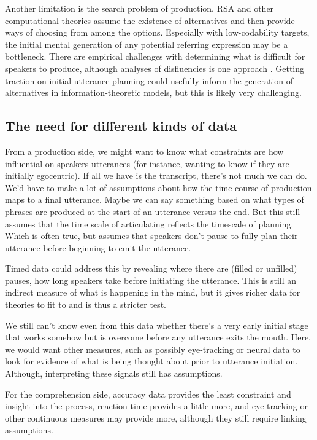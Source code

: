 \documentclass[]{article}
\begin{document}
Another limitation is the search problem of production. RSA and other computational theories assume the existence of alternatives and then provide ways of choosing from among the options. Especially with low-codability targets, the initial mental generation of any potential referring expression may be a bottleneck. There are empirical challenges with determining what is difficult for speakers to produce, although analyses of disfluencies is one approach \citep{yoon2014}.  Getting traction on initial utterance planning could usefully inform the generation of alternatives in information-theoretic models, but this is likely very challenging. 

\subsection{The need for different kinds of data}

From a production side, we might want to know what constraints are how influential on speakers utterances (for instance, wanting to know if they are initially egocentric). If all we have is the transcript, there's not much we can do. We'd have to make a lot of assumptions about how the time course of production maps to a final utterance. Maybe we can say something based on what types of phrases are produced at the start of an utterance versus the end. But this still assumes that the time scale of articulating reflects the timescale of planning. Which is often true, but assumes that speakers don't pause to fully plan their utterance before beginning to emit the utterance. 

Timed data could address this by revealing where there are (filled or unfilled) pauses, how long speakers take before initiating the utterance. This is still an indirect measure of what is happening in the mind, but it gives richer data for theories to fit to and is thus a stricter test. 

We still can't know even from this data whether there's a very early initial stage that works somehow but is overcome before any utterance exits the mouth. Here, we would want other measures, such as possibly eye-tracking or neural data to look for evidence of what is being thought about prior to utterance initiation. Although, interpreting these signals still has assumptions. 

For the comprehension side, accuracy data provides the least constraint and insight into the process, reaction time provides a little more, and eye-tracking or other continuous measures may provide more, although they still require linking assumptions. 
\end{document}
